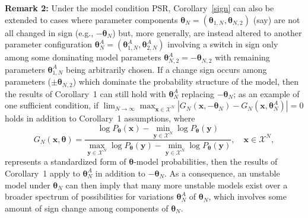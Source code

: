 \documentclass[12pt]{article}
\newcommand{\blue}[1]{{\color{blue} #1}}
\theoremstyle{definition}
\begin{document}
\blue{


\noindent \textbf{Remark 2:}  Under the model condition PSR, Corollary~\ref{sign} can also be extended to
cases where parameter components $\boldsymbol \theta_N =(\boldsymbol \theta_{1,N}, \boldsymbol \theta_{N,2})$ (say) are not all changed in sign (e.g., $-\boldsymbol \theta_N$) but, more generally, are instead  altered to
another parameter configuration $\boldsymbol \theta_{N}^A = ( \boldsymbol \theta_{1,N}^A, \boldsymbol \theta_{2,N}^A )$
 involving a switch in sign only among some dominating model parameters $\boldsymbol \theta_{N,2}^A=- \boldsymbol \theta_{N,2}$ with remaining parameters $\boldsymbol \theta_{1,N}^A$ being arbitrarily chosen.  If a change  sign occurs among  parameters ($\pm \boldsymbol \theta_{N,2}$) which dominate the probability structure of the model, then the results of Corollary~1  can still hold  with $\boldsymbol \theta_{N}^A$
  replacing $-\boldsymbol \theta_N$; as an example of one sufficient condition, if $
  \lim_{N\to \infty} \max_{\boldsymbol x \in \mathcal{X}^N} |G_N(\boldsymbol x, -\boldsymbol \theta_{N}) - G_N(\boldsymbol x, \boldsymbol \theta_{N}^A)|=0$ holds  in addition to Corollary~1 assumptions, where
  \[
  G_N(\boldsymbol x, \boldsymbol \theta) =   \frac{\log P_{\boldsymbol \theta}(\boldsymbol x) - \min_{\boldsymbol y \in\mathcal{X}^N}\log P_{\boldsymbol \theta}(\boldsymbol y) }{\max_{\boldsymbol y \in\mathcal{X}^N}\log P_{\boldsymbol \theta}(\boldsymbol y)  - \min_{\boldsymbol y \in\mathcal{X}^N}\log P_{\boldsymbol \theta}(\boldsymbol y) }, \quad \boldsymbol x \in\mathcal{X}^N,
  \]
 represents a standardized form of $\boldsymbol \theta$-model probabilities, then the results of Corollary~1 apply to 
  $\boldsymbol \theta_{N}^A$ in addition to $-\boldsymbol \theta_N$.
  As a consequence, an unstable model under $\boldsymbol \theta_N$ can then imply that many more unstable models exist  over a broader spectrum of possibilities for variations $\boldsymbol \theta_{N}^A$ of $\boldsymbol \theta_N$, which involves some amount of sign change among components of $\boldsymbol \theta_N$.  
 

}
\end{document}
